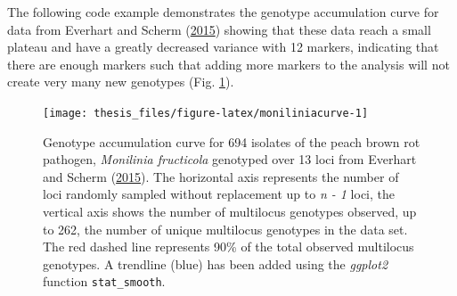 \documentclass[double,12pt]{beavtex}
\begin{document}
  The following code example demonstrates the genotype accumulation curve
  for data from Everhart and Scherm
  (\protect\hyperlink{ref-everhart2014fine}{2015}) showing that these data
  reach a small plateau and have a greatly decreased variance with 12
  markers, indicating that there are enough markers such that adding more
  markers to the analysis will not create very many new genotypes (Fig.
  \ref{fig:moniliniacurve}).
  
  \begin{Shaded}
  \begin{Highlighting}[]
  \NormalTok{(}\NormalTok{);}
  \NormalTok{(}\NormalTok{);}
  \NormalTok{(}\NormalTok{, } \NormalTok{);}
  
  \NormalTok{(}\NormalTok{);}
   \NormalTok{);}
  \StringTok{ }\NormalTok{() +}\StringTok{ }\NormalTok{();   }
  \StringTok{ }\NormalTok{(}\NormalTok{(} \NormalTok{)); }
  \end{Highlighting}
  \end{Shaded}
  
  \begin{figure}
  
  {\centering \texttt{[image: thesis\_files/figure-latex/moniliniacurve-1]} 
  
  }
  
  \caption[Genotype accumulation curve]{Genotype accumulation curve for 694 isolates of the peach brown rot
  pathogen, \emph{Monilinia fructicola} genotyped over 13 loci from
  Everhart and Scherm (\protect\hyperlink{ref-everhart2014fine}{2015}).
  The horizontal axis represents the number of loci randomly sampled
  without replacement up to \emph{n - 1} loci, the vertical axis shows the
  number of multilocus genotypes observed, up to 262, the number of unique
  multilocus genotypes in the data set. The red dashed line represents
  90\% of the total observed multilocus genotypes. A trendline (blue) has
  been added using the \emph{ggplot2} function \texttt{stat\_smooth}.}\label{fig:moniliniacurve}
  \end{figure}
  
\end{document}
